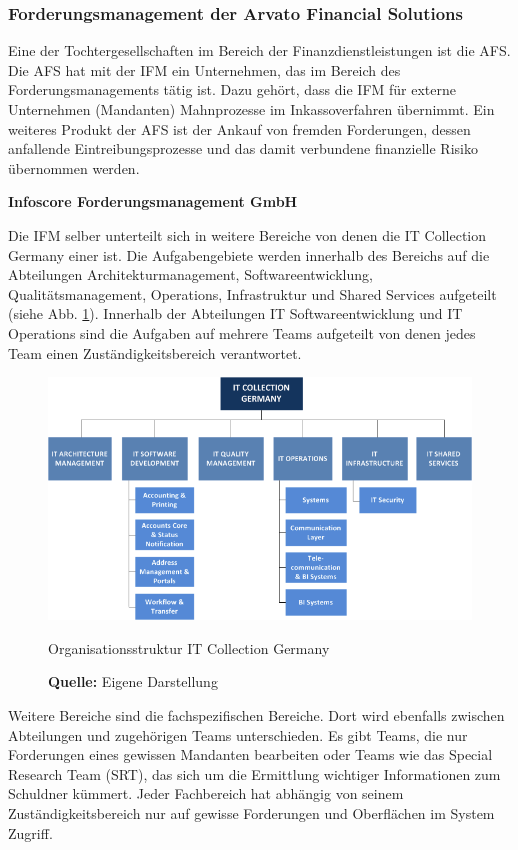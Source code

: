 
\subsubsection{Forderungsmanagement der Arvato Financial Solutions}
Eine der Tochtergesellschaften im Bereich der Finanzdienstleistungen ist die \gls{AFS}. Die \gls{AFS} hat mit der \gls{IFM} ein Unternehmen, das im Bereich des Forderungsmanagements tätig ist. Dazu gehört, dass die \gls{IFM} für externe Unternehmen (Mandanten) Mahnprozesse im Inkassoverfahren übernimmt. Ein weiteres Produkt der \gls{AFS} ist der Ankauf von fremden Forderungen, dessen anfallende Eintreibungsprozesse und das damit verbundene finanzielle Risiko übernommen werden. 

\textbf{Infoscore Forderungsmanagement GmbH}

Die \gls{IFM} selber unterteilt sich in weitere Bereiche von denen die IT Collection Germany einer ist. Die Aufgabengebiete werden innerhalb des Bereichs auf die Abteilungen Architekturmanagement, Softwareentwicklung, Qualitätsmanagement, Operations, Infrastruktur und Shared Services aufgeteilt (siehe Abb. \ref{fig:organisationsstruktur}). Innerhalb der Abteilungen IT Softwareentwicklung und IT Operations sind die Aufgaben auf mehrere Teams aufgeteilt von denen jedes Team einen Zuständigkeitsbereich verantwortet. 
\begin{figure}[H]
  \centering
  \includegraphics[scale=0.8]{img/IT_Collection_Germany_Organisation.png}
  \caption{Organisationsstruktur IT Collection Germany}
  \caption*{\textbf{Quelle:} Eigene Darstellung}
  \label{fig:organisationsstruktur}
\end{figure}

Weitere Bereiche sind die fachspezifischen Bereiche. Dort wird ebenfalls zwischen Abteilungen und zugehörigen Teams unterschieden. Es gibt Teams, die nur Forderungen eines gewissen Mandanten bearbeiten oder Teams wie das Special Research Team (SRT), das sich um die Ermittlung wichtiger Informationen zum Schuldner kümmert. Jeder Fachbereich hat abhängig von seinem Zuständigkeitsbereich nur auf gewisse Forderungen und Oberflächen im System Zugriff.

